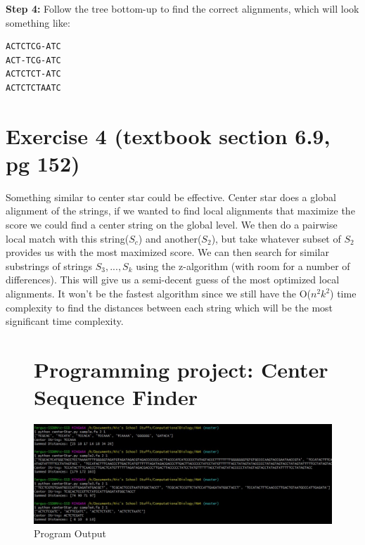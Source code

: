 \documentclass{article}
\begin{document}
\textbf{Step 4:} Follow the tree bottom-up to find the correct alignments, which will look something like:
\begin{verbatim} 
ACTCTCG-ATC
ACT-TCG-ATC
ACTCTCT-ATC
ACTCTCTAATC
\end{verbatim}

\section{Exercise 4 (textbook section 6.9, pg 152)}
Something similar to center star could be effective. Center star does a global alignment of the strings, if we wanted to find local alignments that maximize the score we could find a center string on the global level. We then do a pairwise local match with this string($S_c$) and another($S_2$), but take whatever subset of $S_2$ provides us with the most maximized score. We can then search for similar substrings of strings $S_3,...,S_k$ using the z-algorithm (with room for a number of differences). This will give us a semi-decent guess of the most optimized local alignments. It won't be the fastest algorithm since we still have the O($n^2k^2$) time complexity to find the distances between each string which will be the most significant time complexity.

\newpage
\begin{figure}
	\section{Programming project: Center Sequence Finder}
    \includegraphics[width=1.75\textwidth,center]{HW4output.jpg}
    \caption{Program Output}
\end{figure}
\end{document}
